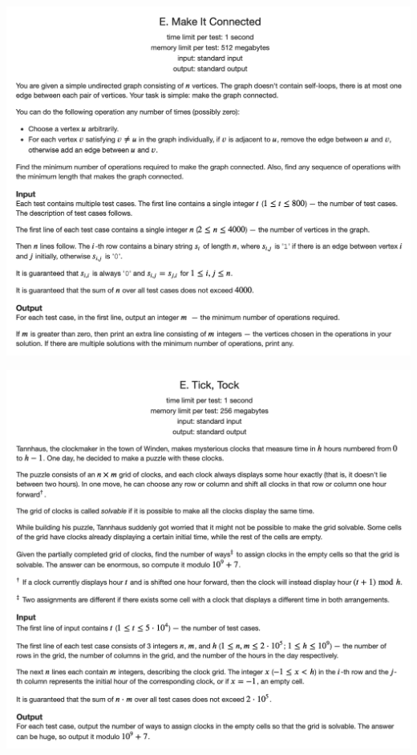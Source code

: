 \documentclass[11pt]{scrartcl}
\begin{document}
\includegraphics[width=\textwidth,height=0.7\textheight]{CF5}

\includegraphics[width=\textwidth,height=0.7\textheight]{CF6}
\end{document}
